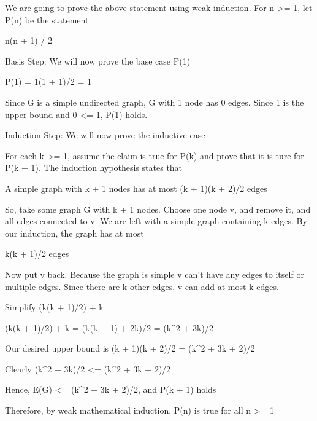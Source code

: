 We are going to prove the above statement using weak induction. For n >= 1, let P(n) be the statement

n(n + 1) / 2

Basis Step: We will now prove the base case P(1)

P(1) = 1(1 + 1)/2 = 1

Since G is a simple undirected graph, G with 1 node has 0 edges. Since 1 is the upper bound and 0 <= 1, P(1) holds.

Induction Step: We will now prove the inductive case

For each k >= 1, assume the claim is true for P(k) and prove that it is ture for P(k + 1). The induction hypothesis states that

A simple graph with k + 1 nodes has at most (k + 1)(k + 2)/2 edges

So, take some graph G with k + 1 nodes. Choose one node v, and remove it, and all edges connected to v. We are left with a simple graph containing k edges. By our induction, the graph has at most

k(k + 1)/2 edges

Now put v back. Because the graph is simple v can't have any edges to itself or multiple edges. Since there are k other edges, v can add at most k edges.

Simplify (k(k + 1)/2) + k

(k(k + 1)/2) + k = (k(k + 1) + 2k)/2
= (k^2 + 3k)/2

Our desired upper bound is (k + 1)(k + 2)/2 = (k^2 + 3k + 2)/2

Clearly (k^2 + 3k)/2 <= (k^2 + 3k + 2)/2

Hence, E(G) <= (k^2 + 3k + 2)/2, and P(k + 1) holds

Therefore, by weak mathematical induction, P(n) is true for all n >= 1
